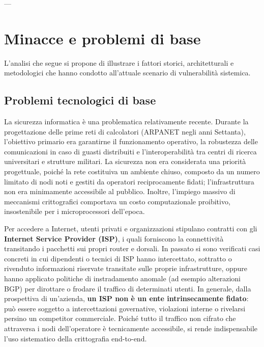 \documentclass[../../main.tex]{subfiles}
\begin{document}
---

\section{Minacce e problemi di base}
\label{sec:minacce_e_problemi}

L'analisi che segue si propone di illustrare i fattori storici, architetturali e metodologici che hanno condotto all'attuale scenario di vulnerabilità sistemica.

\subsection{Problemi tecnologici di base}
\label{subsec:problemi_tecnologici}

La sicurezza informatica è una problematica relativamente recente. Durante la progettazione delle prime reti di calcolatori (ARPANET negli anni Settanta), l'obiettivo primario era garantirne il funzionamento operativo, la robustezza delle comunicazioni in caso di guasti distribuiti e l'interoperabilità tra centri di ricerca universitari e strutture militari. La sicurezza non era considerata una priorità progettuale, poiché la rete costituiva un ambiente chiuso, composto da un numero limitato di nodi noti e gestiti da operatori reciprocamente fidati; l'infrastruttura non era minimamente accessibile al pubblico. Inoltre, l'impiego massivo di meccanismi crittografici comportava un costo computazionale proibitivo, insostenibile per i microprocessori dell'epoca.

Per accedere a Internet, utenti privati e organizzazioni stipulano contratti con gli \textbf{Internet Service Provider (ISP)}, i quali forniscono la connettività transitando i pacchetti sui propri router e dorsali. In passato si sono verificati casi concreti in cui dipendenti o tecnici di ISP hanno intercettato, sottratto o rivenduto informazioni riservate transitate sulle proprie infrastrutture, oppure hanno applicato politiche di instradamento anomale (ad esempio alterazioni BGP) per dirottare o frodare il traffico di determinati utenti. In generale, dalla prospettiva di un'azienda, \textbf{un ISP non è un ente intrinsecamente fidato}: può essere soggetto a intercettazioni governative, violazioni interne o rivelarsi persino un competitor commerciale. Poiché tutto il traffico non cifrato che attraversa i nodi dell'operatore è tecnicamente accessibile, si rende indispensabile l'uso sistematico della crittografia end-to-end.
\end{document}
